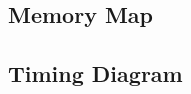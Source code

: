 \documentclass{article}
\begin{document}
  \subsection{Memory Map}



  \subsection{Timing Diagram}


\end{document}
